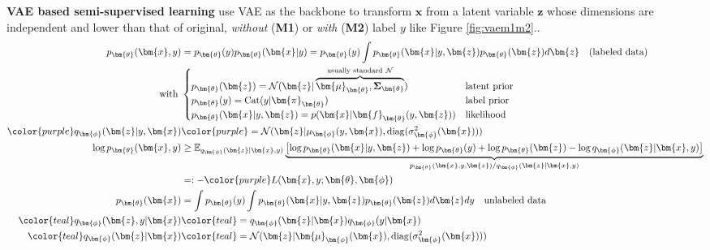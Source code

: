 \textbf{VAE based semi-supervised learning} use VAE as the backbone to transform $\bm{x}$ from a latent variable $\bm{z}$ 
whose dimensions are independent and lower than that of original, \textit{without} (\textbf{M1}) or \textit{with} (\textbf{M2}) label $y$ like Figure \ref{fig:vaem1m2}..
\begin{align}
    p_{\bm{\theta}}(\bm{x},y)
    &= p_{\bm{\theta}}(y)p_{\bm{\theta}}(\bm{x}|y) = p_{\bm{\theta}}(y)\int p_{\bm{\theta}}(\bm{x}|y,\bm{z})p_{\bm{\theta}}(\bm{z})d\bm{z}~~~\text{(labeled data)} \\
    \text{with}~&\begin{cases}
        p_{\bm{\theta}}(\bm{z}) = \mathcal{N}(\bm{z}|\overbrace{\bm{\mu}_{\bm{\theta}}, \mathbf{\Sigma}_{\bm{\theta}}}^{\text{usually standard}~\mathcal{N}}) & \text{latent prior} \\
        p_{\bm{\theta}}(y) = \text{Cat}(y|\bm{\pi}_{\bm{\theta}}) & \text{label prior} \\
        p_{\bm{\theta}}(\bm{x}|y,\bm{z}) = p(\bm{x}|\bm{f}_{\bm{\theta}}(y,\bm{z})) & \text{likelihood}
    \end{cases} \\
    {\color{purple}q_{\bm{\phi}}(\bm{z}|y,\bm{x})} 
    &{\color{purple}= \mathcal{N}(\bm{z}|\mu_{\bm{\phi}}(y,\bm{x}),\mathrm{diag}(\sigma^2_{\bm{\phi}}(\bm{x})))} \label{eq:m2confuse}\\
    \log p_{\bm{\theta}}(\bm{x},y) 
    &\geq \mathbb{E}_{q_{\bm{\phi}}(\bm{z}|\bm{x},y)}\underbrace{\left[
        \log p_{\bm{\theta}}(\bm{x}|y,\bm{z}) + \log p_{\bm{\theta}}(y) + \log p_{\bm{\theta}}(\bm{z}) - \log q_{\bm{\phi}}(\bm{z}|\bm{x},y)
    \right]}_{{p_{\bm{\theta}}(\bm{x},y,\bm{z})}/{q_{\bm{\phi}}(\bm{z}|\bm{x},y)}}\\
    &=:-{\color{purple}L(\bm{x},y;\bm{\theta},\bm{\phi})} \\
    p_{\bm{\theta}}(\bm{x})
    &=  \int p_{\bm{\theta}}(y)\int p_{\bm{\theta}}(\bm{x}|y,\bm{z})p_{\bm{\theta}}(\bm{z})d\bm{z}dy~~~\text{unlabeled data} \\
    {\color{teal}q_{\bm{\phi}}(\bm{z},y|\bm{x})} 
    &{\color{teal}=q_{\bm{\phi}}(\bm{z}|\bm{x})q_{\bm{\phi}}(y|\bm{x})} \\ 
    {\color{teal}q_{\bm{\phi}}(\bm{z}|\bm{x})}
    &{\color{teal} = \mathcal{N}(\bm{z}|\bm{\mu}_{\bm{\phi}}(\bm{x}),\mathrm{diag}(\sigma^2_{\bm{\phi}}(\bm{x})))} \\

\end{align}
